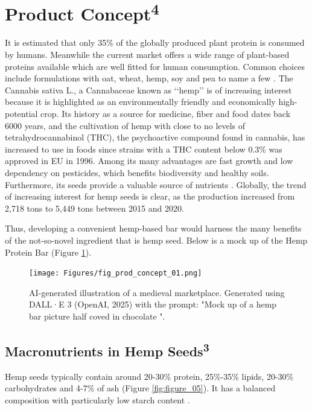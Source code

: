 \section{Product Concept\textsuperscript{4}}
It is estimated that only 35\% of the globally produced plant protein is consumed by humans. Meanwhile the current market offers a wide range of plant-based proteins available which are well fitted for human consumption. Common choices include formulations with oat, wheat, hemp, soy and pea to name a few \cite*{Gorissen2018PlantProteinIsolates}. The Cannabis sativa L., a Cannabaceae known as ‘‘hemp’’ is of increasing interest because it is highlighted as an environmentally friendly and economically high-potential crop. Its history as a source for medicine, fiber and food dates back 6000 years, and the cultivation of hemp with close to no levels of tetrahydrocannabinol (THC), the psychoactive compound found in cannabis, has increased to use in foods since strains with a THC content below 0.3\% was approved in EU in 1996. Among its many advantages are fast growth and low dependency on pesticides, which benefits biodiversity and healthy soils. Furthermore, its seeds provide a valuable source of nutrients \cite*{HempBook}. Globally, the trend of increasing interest for hemp seeds is clear, as the production increased from 2,718 tons to 5,449 tons between 2015 and 2020. 

\vspace{1em}
Thus, developing a convenient hemp-based bar would harness the many benefits of the not-so-novel ingredient that is hemp seed. Below is a mock up of the Hemp Protein Bar (Figure \ref*{fig:figure_04}).

\begin{figure}[H]
    \centering
    \texttt{[image: Figures/fig\_prod\_concept\_01.png]}
    \caption{AI-generated illustration of a medieval marketplace. Generated using DALL·E 3 (OpenAI, 2025) with the prompt: "Mock up of a hemp bar picture half coved in chocolate ".}
    \label{fig:figure_04}
\end{figure}


\subsection{Macronutrients in Hemp Seeds\textsuperscript{3}}
Hemp seeds typically contain around 20-30\% protein, 25\%-35\% lipids, 20-30\% carbohydrates and 4-7\% of ash (Figure \ref*{fig:figure_05}). It has a balanced composition with particularly low starch content \cite*{montero2023hemp}.

